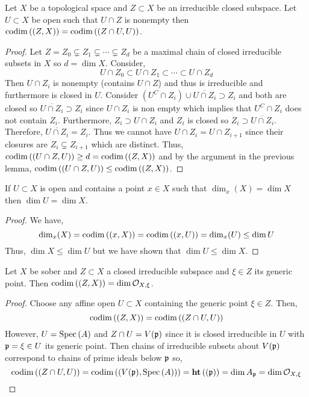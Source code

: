 \documentclass[12pt]{article}
\begin{document}
\begin{lemma}
Let $X$ be a topological space and $Z \subset X$ be an irreducible closed subspace. Let $U \subset X$ be open such that $U \cap Z$ is nonempty then $\mathrm{codim}\left( (Z, X) \right) = \mathrm{codim}\left( (Z \cap U, U) \right)$.
\end{lemma}

\begin{proof}
Let $Z = Z_0 \subsetneq Z_1 \subsetneq \cdots \subsetneq Z_d$ be a maximal chain of closed irreducible subsets in $X$ so $d = \dim{X}$. Consider,
\[ U \cap Z_0 \subset U \cap Z_1 \subset \cdots \subset U \cap Z_d \]
Then $U \cap Z_i$ is nonempty (contains $U \cap Z$) and thus is irreducible and furthermore is closed in $U$. Consider $(U^C \cap Z_i) \cup \overline{U \cap Z_i} \supset Z_i$ and both are closed so $\overline{U \cap Z_i} \supset Z_i$ since $U \cap Z_i$ is non empty which implies that $U^C \cap Z_i$ does not contain $Z_i$. Furthermore, $Z_i \supset U \cap Z_i$ and $Z_i$ is closed so $Z_i \supset \overline{U \cap Z_i}$. Therefore, $\overline{U \cap Z_i} = Z_i$. Thus we cannot have $U \cap Z_{i} = U \cap Z_{i+1}$ since their closures are $Z_i \subsetneq Z_{i+1}$ which are distinct. Thus, $\mathrm{codim}\left( (U \cap Z, U) \right) \ge d = \mathrm{codim}\left( (Z, X) \right)$ and by the argument in the previous lemma, $\mathrm{codim}\left( (U \cap Z, U) \right) \le \mathrm{codim}\left( (Z, X) \right)$.
\end{proof}

\begin{corollary}
If $U \subset X$ is open and contains a point $x \in X$ such that $\dim_x(X) = \dim{X}$ then $\dim{U} = \dim{X}$.
\end{corollary}

\begin{proof}
We have, \[ \dim_x(X) = \mathrm{codim}\left( (x, X) \right) = \mathrm{codim}\left( (x, U) \right) = \dim_x(U) \le \dim{U} \]
Thus, $\dim{X} \le \dim{U}$ but we have shown that $\dim{U} \le \dim{X}$.
\end{proof}

\begin{lemma}
Let $X$ be sober and $Z \subset X$ a closed irreducible subspace and $\xi \in Z$ its generic point. Then $\mathrm{codim}\left( (Z, X) \right) = \dim{\mathcal{O}_{X, \xi}}$.
\end{lemma}

\begin{proof}
Choose any affine open $U \subset X$ containing the generic point $\xi \in Z$. Then,
\[ \mathrm{codim}\left( (Z, X) \right) = \mathrm{codim}\left( (Z \cap U, U) \right) \]
However, $U = \mathrm{Spec}\left( A \right)$ and $Z \cap U = V(\mathfrak{p})$ since it is closed irreducible in $U$ with $\mathfrak{p} = \xi \in U$ its generic point. Then chains of irreducible subsets about $V(\mathfrak{p})$ correspond to chains of prime ideals below $\mathfrak{p}$ so,
\[ \mathrm{codim}\left( (Z \cap U, U) \right) = \mathrm{codim}\left( (V(\mathfrak{p}), \mathrm{Spec}\left( A \right)) \right) = \mathbf{ht}\left( (\mathfrak{p}) \right) = \dim{A_{\mathfrak{p}}} = \dim{\mathcal{O}_{X, \xi}} \]
\end{proof}
\end{document}
